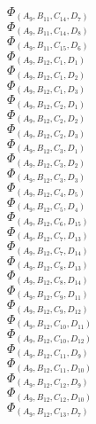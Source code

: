 \documentclass[14pt]{article}
\begin{document}
    $\Phi_{({A}_{9}, {B}_{11}, {C}_{14}, {D}_{7})}$ \\ 
    $\Phi_{({A}_{9}, {B}_{11}, {C}_{14}, {D}_{8})}$ \\ 
    $\Phi_{({A}_{9}, {B}_{11}, {C}_{15}, {D}_{6})}$ \\ 
    $\Phi_{({A}_{9}, {B}_{12}, {C}_{1}, {D}_{1})}$ \\ 
    $\Phi_{({A}_{9}, {B}_{12}, {C}_{1}, {D}_{2})}$ \\ 
    $\Phi_{({A}_{9}, {B}_{12}, {C}_{1}, {D}_{3})}$ \\ 
    $\Phi_{({A}_{9}, {B}_{12}, {C}_{2}, {D}_{1})}$ \\ 
    $\Phi_{({A}_{9}, {B}_{12}, {C}_{2}, {D}_{2})}$ \\ 
    $\Phi_{({A}_{9}, {B}_{12}, {C}_{2}, {D}_{3})}$ \\ 
    $\Phi_{({A}_{9}, {B}_{12}, {C}_{3}, {D}_{1})}$ \\ 
    $\Phi_{({A}_{9}, {B}_{12}, {C}_{3}, {D}_{2})}$ \\ 
    $\Phi_{({A}_{9}, {B}_{12}, {C}_{3}, {D}_{3})}$ \\ 
    $\Phi_{({A}_{9}, {B}_{12}, {C}_{4}, {D}_{5})}$ \\ 
    $\Phi_{({A}_{9}, {B}_{12}, {C}_{5}, {D}_{4})}$ \\ 
    $\Phi_{({A}_{9}, {B}_{12}, {C}_{6}, {D}_{15})}$ \\ 
    $\Phi_{({A}_{9}, {B}_{12}, {C}_{7}, {D}_{13})}$ \\ 
    $\Phi_{({A}_{9}, {B}_{12}, {C}_{7}, {D}_{14})}$ \\ 
    $\Phi_{({A}_{9}, {B}_{12}, {C}_{8}, {D}_{13})}$ \\ 
    $\Phi_{({A}_{9}, {B}_{12}, {C}_{8}, {D}_{14})}$ \\ 
    $\Phi_{({A}_{9}, {B}_{12}, {C}_{9}, {D}_{11})}$ \\ 
    $\Phi_{({A}_{9}, {B}_{12}, {C}_{9}, {D}_{12})}$ \\ 
    $\Phi_{({A}_{9}, {B}_{12}, {C}_{10}, {D}_{11})}$ \\ 
    $\Phi_{({A}_{9}, {B}_{12}, {C}_{10}, {D}_{12})}$ \\ 
    $\Phi_{({A}_{9}, {B}_{12}, {C}_{11}, {D}_{9})}$ \\ 
    $\Phi_{({A}_{9}, {B}_{12}, {C}_{11}, {D}_{10})}$ \\ 
    $\Phi_{({A}_{9}, {B}_{12}, {C}_{12}, {D}_{9})}$ \\ 
    $\Phi_{({A}_{9}, {B}_{12}, {C}_{12}, {D}_{10})}$ \\ 
    $\Phi_{({A}_{9}, {B}_{12}, {C}_{13}, {D}_{7})}$ \\ 
\end{document}

